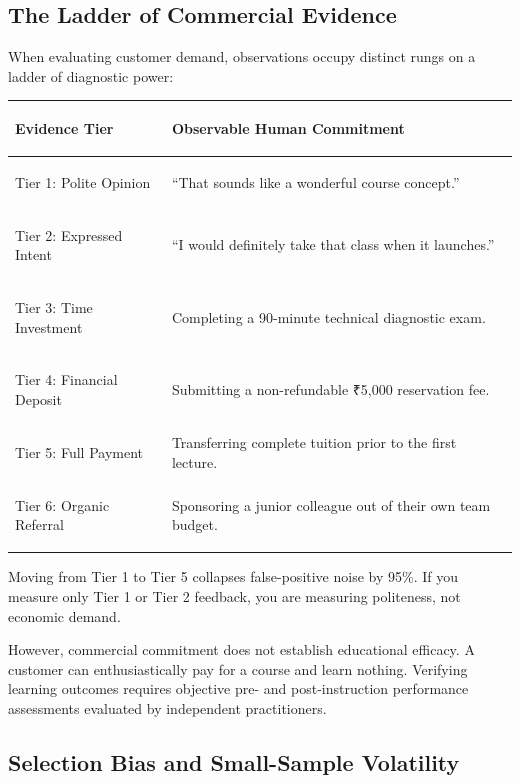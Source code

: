 \subsection{The Ladder of Commercial Evidence}

When evaluating customer demand, observations occupy distinct rungs on a ladder of diagnostic power:

\begin{tcolorbox}[
  enhanced,
  colback=BayesSurface!60,
  colframe=BayesBorder,
  boxrule=0.5pt,
  arc=3pt,
  left=3pt,right=3pt,top=3pt,bottom=3pt,
  boxsep=1pt
]
\scriptsize
\begin{tabularx}{\linewidth}{>{\bfseries\raggedright\arraybackslash}p{2.6cm} X}
\toprule
\textbf{Evidence Tier} & \textbf{Observable Human Commitment} \\
\midrule
Tier 1: Polite Opinion & ``That sounds like a wonderful course concept.'' \\
\addlinespace[2pt]
Tier 2: Expressed Intent & ``I would definitely take that class when it launches.'' \\
\addlinespace[2pt]
Tier 3: Time Investment & Completing a 90-minute technical diagnostic exam. \\
\addlinespace[2pt]
Tier 4: Financial Deposit & Submitting a non-refundable ₹5,000 reservation fee. \\
\addlinespace[2pt]
Tier 5: Full Payment & Transferring complete tuition prior to the first lecture. \\
\addlinespace[2pt]
Tier 6: Organic Referral & Sponsoring a junior colleague out of their own team budget. \\
\bottomrule
\end{tabularx}
\end{tcolorbox}

Moving from Tier 1 to Tier 5 collapses false-positive noise by 95\%. If you measure only Tier 1 or Tier 2 feedback, you are measuring politeness, not economic demand.

However, commercial commitment does not establish educational efficacy. A customer can enthusiastically pay for a course and learn nothing. Verifying learning outcomes requires objective pre- and post-instruction performance assessments evaluated by independent practitioners.

\subsection{Selection Bias and Small-Sample Volatility}

